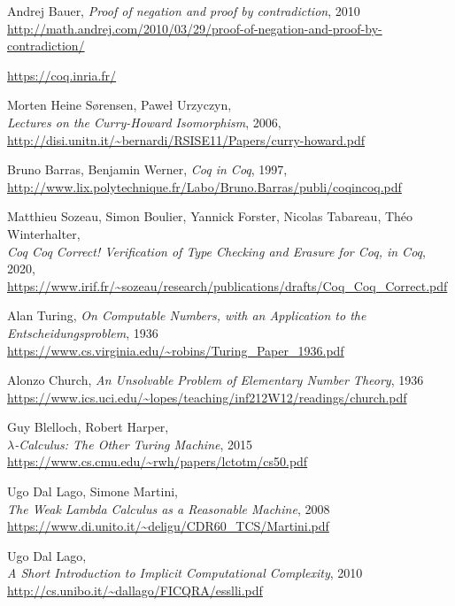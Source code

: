 \documentclass[declaration,mgr,english,shortabstract]{iithesis}
\begin{document}
\begin{thebibliography}{1}
    Andrej Bauer, \textit{Proof of negation and proof by contradiction}, 2010 \\
    \url{http://math.andrej.com/2010/03/29/proof-of-negation-and-proof-by-contradiction/}

    \url{https://coq.inria.fr/}

    Morten Heine Sørensen, Paweł Urzyczyn, \\
    \textit{Lectures on the Curry-Howard Isomorphism}, 2006, \\
    \url{http://disi.unitn.it/~bernardi/RSISE11/Papers/curry-howard.pdf}

    Bruno Barras, Benjamin Werner, \textit{Coq in Coq}, 1997, \\
    \url{http://www.lix.polytechnique.fr/Labo/Bruno.Barras/publi/coqincoq.pdf}

    Matthieu Sozeau, Simon Boulier, Yannick Forster, Nicolas Tabareau, Théo Winterhalter, \\
    \textit{Coq Coq Correct! Verification of Type Checking and Erasure for Coq, in Coq}, 2020, \\
    \url{https://www.irif.fr/~sozeau/research/publications/drafts/Coq_Coq_Correct.pdf}

    Alan Turing, \textit{On Computable Numbers, with an Application to the Entscheidungsproblem}, 1936 \\
    \url{https://www.cs.virginia.edu/~robins/Turing_Paper_1936.pdf}

    Alonzo Church, \textit{An Unsolvable Problem of Elementary Number Theory}, 1936 \\
    \url{https://www.ics.uci.edu/~lopes/teaching/inf212W12/readings/church.pdf}

    Guy Blelloch, Robert Harper, \\
    \textit{$\lambda$-Calculus: The Other Turing Machine}, 2015 \\
    \url{https://www.cs.cmu.edu/~rwh/papers/lctotm/cs50.pdf}

    Ugo Dal Lago, Simone Martini, \\
    \textit{The Weak Lambda Calculus
    as a Reasonable Machine}, 2008 \\
    \url{https://www.di.unito.it/~deligu/CDR60_TCS/Martini.pdf}

    Ugo Dal Lago, \\
    \textit{A Short Introduction
    to Implicit Computational Complexity}, 2010 \\
    \url{http://cs.unibo.it/~dallago/FICQRA/esslli.pdf}


\end{thebibliography}
\end{document}
